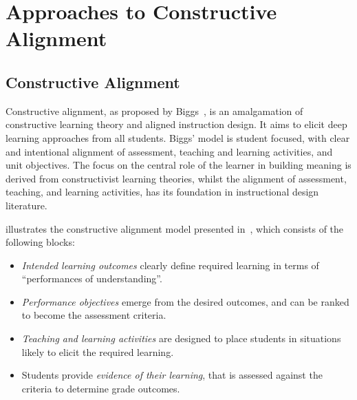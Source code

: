 
\chapter{Approaches to Constructive Alignment} %
\label{cha:background}

\section{Constructive Alignment} %
\label{sec:constructive_alignment}

Constructive alignment, as proposed by Biggs~\cite{Biggs:1996c}, is an amalgamation of constructive learning theory and aligned instruction design. It aims to elicit deep learning approaches from all students. Biggs' model is student focused, with clear and intentional alignment of assessment, teaching and learning activities, and unit objectives. The focus on the central role of the learner in building meaning is derived from constructivist learning theories, whilst the alignment of assessment, teaching, and learning activities, has its foundation in instructional design literature. 

 illustrates the constructive alignment model presented in~\cite{Houghton:2004}, which consists of the following blocks:

\begin{itemize}
	\item \emph{Intended learning outcomes} clearly define required learning in terms of ``performances of understanding''.
	\item \emph{Performance objectives} emerge from the desired outcomes, and can be ranked to become the assessment criteria.
	\item \emph{Teaching and learning activities} are designed to place students in situations likely to elicit the required learning.
	\item Students provide \emph{evidence of their learning}, that is assessed against the criteria to determine grade outcomes.
\end{itemize}


